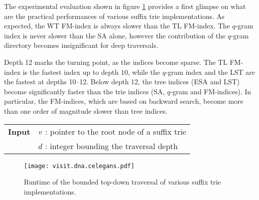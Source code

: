 The experimental evaluation shown in figure \ref{fig:visit-dna} provides a first glimpse on what are the practical performances of various suffix trie implementations.
As expected, the WT FM-index is always slower than the TL FM-index.
The $q$-gram index is never slower than the SA alone, however the contribution of the $q$-gram directory becomes insignificant for deep traversals.

Depth 12 marks the turning point, as the indices become sparse.
The TL FM-index is the fastest index up to depth $10$, while the $q$-gram index and the LST are the fastest at depths 10--12.
Below depth 12, the tree indices (ESA and LST) become significantly faster than the trie indices (SA, $q$-gram and FM-indices).
In particular, the FM-indices, which are based on backward search, become more than one order of magnitude slower than tree indices.

\begin{figure*}[t]
\begin{center}
\begin{minipage}[t]{.7\textwidth}
\begin{algorithm}[H]
\begin{tabular}{ll}
\textbf{Input}  & $v$ : pointer to the root node of a suffix trie\\
 			    & $d$ : integer bounding the traversal depth\\
\end{tabular}
\begin{algorithmic}[1]
		\Repeat
			\State {}
		\Until {}
	\EndIf
\EndIf
\end{algorithmic}
\label{alg:st-dfs}
\end{algorithm}
\end{minipage}
\end{center}
\end{figure*}

\begin{figure}[b]
\begin{center}
\caption[Top-down traversal runtime]{Runtime of the bounded top-down traversal of various suffix trie implementations.}
\label{fig:visit-dna}
\texttt{[image: visit.dna.celegans.pdf]}
\end{center}
\end{figure}

